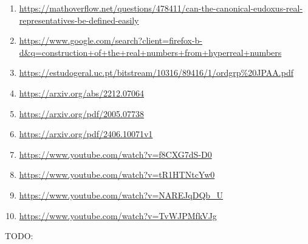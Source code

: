\begin{enumerate}
    \item \url{https://mathoverflow.net/questions/478411/can-the-canonical-eudoxus-real-representatives-be-defined-easily}
    \item \url{https://www.google.com/search?client=firefox-b-d&q=construction+of+the+real+numbers+from+hyperreal+numbers}
    \item \url{https://estudogeral.uc.pt/bitstream/10316/89416/1/ordgrp\%20JPAA.pdf}
    \item \url{https://arxiv.org/abs/2212.07064}
    \item \url{https://arxiv.org/pdf/2005.07738}
    \item \url{https://arxiv.org/pdf/2406.10071v1}
    \item \url{https://www.youtube.com/watch?v=f8CXG7dS-D0}
    \item \url{https://www.youtube.com/watch?v=tR1HTNtcYw0}
    \item \url{https://www.youtube.com/watch?v=NAREJqDQb_U}
    \item \url{https://www.youtube.com/watch?v=TvWJPMfkVJg}
\end{enumerate}
TODO:
